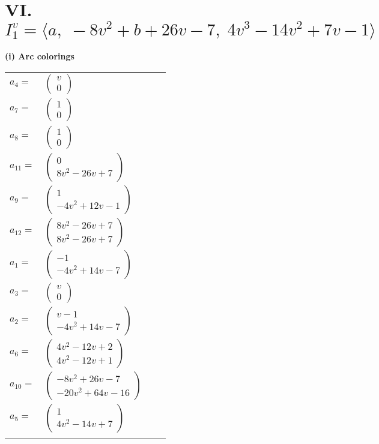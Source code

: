 \documentclass[1p]{elsarticle_modified}
\theoremstyle{definition}
\begin{document}
\centering \section*{VI. $I^v_{1}= \langle a,\;-8 v^2+b+26 v-7,\;4 v^3-14 v^2+7 v-1 \rangle$}
\flushleft \textbf{(i) Arc colorings}\\
\begin{tabular}{m{7pt} m{180pt} m{7pt} m{180pt} }
\flushright $a_{4}=$&$\begin{pmatrix}v\\0\end{pmatrix}$ \\
\flushright $a_{7}=$&$\begin{pmatrix}1\\0\end{pmatrix}$ \\
\flushright $a_{8}=$&$\begin{pmatrix}1\\0\end{pmatrix}$ \\
\flushright $a_{11}=$&$\begin{pmatrix}0\\8 v^2-26 v+7\end{pmatrix}$ \\
\flushright $a_{9}=$&$\begin{pmatrix}1\\-4 v^2+12 v-1\end{pmatrix}$ \\
\flushright $a_{12}=$&$\begin{pmatrix}8 v^2-26 v+7\\8 v^2-26 v+7\end{pmatrix}$ \\
\flushright $a_{1}=$&$\begin{pmatrix}-1\\-4 v^2+14 v-7\end{pmatrix}$ \\
\flushright $a_{3}=$&$\begin{pmatrix}v\\0\end{pmatrix}$ \\
\flushright $a_{2}=$&$\begin{pmatrix}v-1\\-4 v^2+14 v-7\end{pmatrix}$ \\
\flushright $a_{6}=$&$\begin{pmatrix}4 v^2-12 v+2\\4 v^2-12 v+1\end{pmatrix}$ \\
\flushright $a_{10}=$&$\begin{pmatrix}-8 v^2+26 v-7\\-20 v^2+64 v-16\end{pmatrix}$ \\
\flushright $a_{5}=$&$\begin{pmatrix}1\\4 v^2-14 v+7\end{pmatrix}$\\&\end{tabular}
\end{document}
